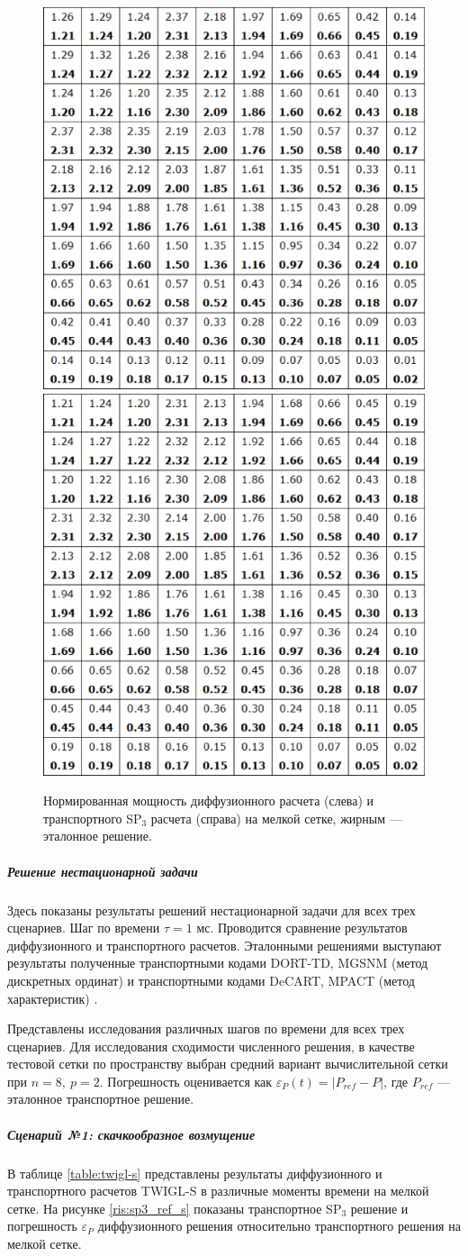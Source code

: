 \documentclass{crm-article}
\begin{document}
\begin{figure}[ht]
\begin{center}
	\includegraphics[width=0.4\linewidth]{dif_pwr.eps} \hspace{20pt}
	\includegraphics[width=0.4\linewidth]{sp3_pwr.eps}\\
	\caption{\label{image:canonsummary} Нормированная мощность диффузионного расчета (слева) и транспортного SP$_3$ расчета (справа) на мелкой сетке, жирным --- эталонное решение.}
	\label{ris:int_pwr}
\end{center}
\end{figure}

\subparagraph{Решение нестационарной задачи}
Здесь показаны результаты решений нестационарной задачи для всех трех сценариев.
Шаг по времени $\tau=1$ мс.
Проводится сравнение результатов диффузионного и транспортного расчетов.
Эталонными решениями выступают результаты полученные транспортными кодами DORT-TD, MGSNM (метод дискретных ординат) и транспортными кодами DeCART, MPACT (метод характеристик) \cite{kondrushin2014}.

Представлены исследования различных шагов по времени для всех трех сценариев.  
Для исследования сходимости численного решения, в качестве тестовой сетки  по пространству выбран средний вариант вычислительной сетки при $n=8,\ p=2$.
Погрешность оценивается как $\varepsilon_P(t) = | P_{ref} - P |$, где $P_{ref}$ --- эталонное транспортное решение.

\subparagraph{Сценарий №1: скачкообразное возмущение}
В таблице \ref{table:twigl-s} представлены результаты диффузионного и транспортного расчетов TWIGL-S в различные моменты времени на мелкой сетке.
На рисунке \ref{ris:sp3_ref_s} показаны транспортное SP$_3$ решение и погрешность $\varepsilon_P$ диффузионного решения относительно транспортного решения на мелкой сетке. 
\end{document}
